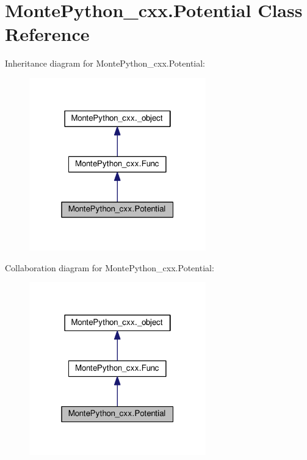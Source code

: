 \hypertarget{classMontePython__cxx_1_1Potential}{}\section{Monte\+Python\+\_\+cxx.\+Potential Class Reference}
\label{classMontePython__cxx_1_1Potential}


Inheritance diagram for Monte\+Python\+\_\+cxx.\+Potential\+:
\nopagebreak
\begin{figure}[H]
\begin{center}
\leavevmode
\includegraphics[width=217pt]{classMontePython__cxx_1_1Potential__inherit__graph}
\end{center}
\end{figure}


Collaboration diagram for Monte\+Python\+\_\+cxx.\+Potential\+:
\nopagebreak
\begin{figure}[H]
\begin{center}
\leavevmode
\includegraphics[width=217pt]{classMontePython__cxx_1_1Potential__coll__graph}
\end{center}
\end{figure}
